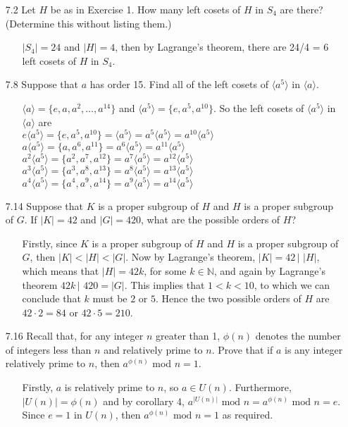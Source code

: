 \documentclass[12pt]{article}
\begin{document}
\begin{enumerate}
\item[7.2] Let $H$ be as in Exercise 1. How many left cosets of $H$ in $S_4$ are there?
(Determine this without listing them.)
\begin{enumerate}
\item[] $|S_4| = 24$ and $|H| = 4$, then by Lagrange's theorem, there are 24/4 = 6 left cosets of
$H$ in $S_4$.
\end{enumerate}

\item[7.8] Suppose that $a$ has order 15. Find all of the left cosets of $\langle a^5\rangle$
in $\langle a \rangle$.
\begin{enumerate}
\item[] $\langle a\rangle = \{ e, a, a^2, \ldots, a^{14} \}$ and $\langle a^5\rangle = 
\{ e, a^5, a^{10} \}$. So the left cosets of $\langle a^5\rangle$ in $\langle a\rangle$ are \\
$e\langle a^5\rangle =   \{e, a^5, a^{10} \} = \langle a^5\rangle = a^5\langle a^5\rangle = a^{10}\langle a^5\rangle$ \\
$a\langle a^5\rangle =   \{a, a^6, a^{11} \} = a^6\langle a^5\rangle = a^{11}\langle a^5\rangle$ \\
$a^2\langle a^5\rangle = \{ a^2, a^7, a^{12} \} = a^7\langle a^5\rangle = a^{12}\langle a^5\rangle$\\
$a^3\langle a^5\rangle = \{ a^3, a^8, a^{13} \} = a^8\langle a^5\rangle = a^{13}\langle a^5\rangle$\\
$a^4\langle a^5\rangle = \{ a^4, a^9, a^{14} \} = a^9 \langle a^5\rangle = a^{14}\langle a^5\rangle$
\end{enumerate}

\item[7.14] Suppose that $K$ is a proper subgroup of $H$ and $H$ is a proper subgroup of $G$.
If $|K| = 42$ and $|G| = 420$, what are the possible orders of $H$?
\begin{enumerate}
\item[] Firstly, since $K$ is a proper subgroup of $H$ and $H$ is a proper subgroup of $G$, then 
$|K| < |H| < |G|$. Now by Lagrange's theorem, $|K| = 42\, |\,\, |H|$, which means that $|H| = 42k$, for some
$k \in \mathbb{N}$, and again by Lagrange's theorem $42k\, |\,\,420 = |G|$. This implies that $1 < k < 10$, to 
which we can conclude that $k$ must be $2$ or $5$. Hence the two possible orders of $H$ are $42 \cdot 2 = 84$
or $42 \cdot 5 = 210$.
\end{enumerate}

\item[7.16] Recall that, for any integer $n$ greater than 1, $\phi(n)$ denotes the number of
integers less than $n$ and relatively prime to $n$. Prove that if $a$ is any integer relatively
prime to $n$, then $a^{\phi(n)}$ mod $n = 1$.
\begin{enumerate}
\item[] Firstly, $a$ is relatively prime to $n$, so $a \in U(n)$. Furthermore, 
$|U(n)| = \phi(n)$ and by corollary 4, $a^{|U(n)|}\mbox{ mod } n = a^{\phi(n)}
\mbox{ mod } n = e$. Since $e = 1$ in $U(n)$, then $a^{\phi(n)} \mbox{ mod } n = 1$ as required.
\end{enumerate}


\end{enumerate}
\end{document}
